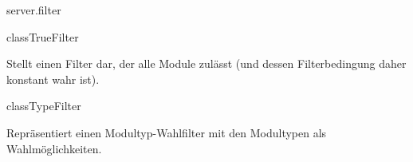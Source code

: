 \begin{texdocpackage}{server.filter}
\begin{texdocclass}{class}{TrueFilter}
\label{texdoclet:edu.kit.informatik.studyplan.server.filter.TrueFilter}
\begin{texdocclassintro}
Stellt einen Filter dar, der alle Module zulässt (und dessen Filterbedingung
 daher konstant wahr ist).\end{texdocclassintro}
\begin{texdocclassconstructors}
\end{texdocclassconstructors}
\begin{texdocclassmethods}
\end{texdocclassmethods}
\end{texdocclass}


\begin{texdocclass}{class}{TypeFilter}
\label{texdoclet:edu.kit.informatik.studyplan.server.filter.TypeFilter}
\begin{texdocclassintro}
Repräsentiert einen Modultyp-Wahlfilter mit den Modultypen als Wahlmöglichkeiten.\end{texdocclassintro}
\begin{texdocclassconstructors}
\end{texdocclassconstructors}
\begin{texdocclassmethods}
\end{texdocclassmethods}
\end{texdocclass}


\end{texdocpackage}



